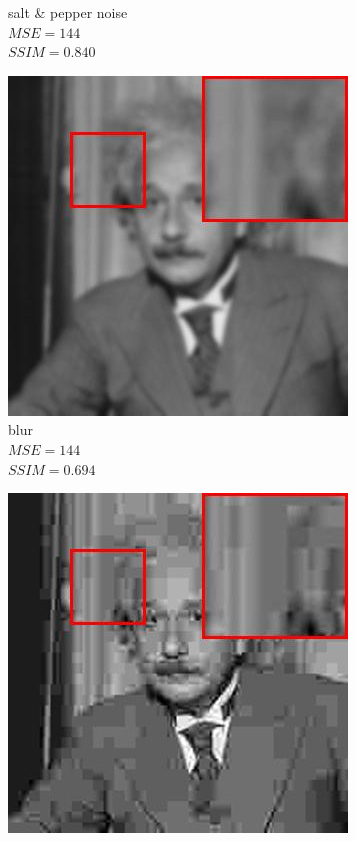 \begin{figure}
\begin{subfigure}[b]{0.3\textwidth}
         \caption{salt \& pepper noise\\$MSE=144$\\$SSIM=0.840$}
         \label{fig:einstein-sp}
     \end{subfigure}
     \hfill
     \begin{subfigure}[b]{0.3\textwidth}
         \centering
         \includegraphics[width=\textwidth]{./figs/image011_bn}
         \caption{blur\\$MSE=144$\\$SSIM=0.694$}
         \label{fig:einstein-bl}
     \end{subfigure}
     \hfill
     \begin{subfigure}[b]{0.3\textwidth}
         \centering
         \includegraphics[width=\textwidth]{./figs/image013_bn}

\end{subfigure}
\end{figure}
